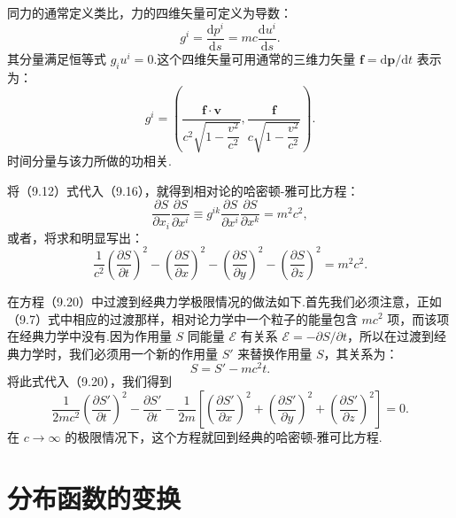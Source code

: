 同力的通常定义类比，力的四维矢量可定义为导数：
\begin{equation}
  g^i=\frac{\mathrm{d}p^i}{\mathrm{d}s}=mc\frac{\mathrm{d}u^i}{\mathrm{d}s}.
\end{equation}
其分量满足恒等式 $g_iu^i=0$.这个四维矢量可用通常的三维力矢量 $\boldsymbol{f}=\mathrm{d}\boldsymbol{p}/\mathrm{d}t$ 表示为：
\begin{equation}
  g^i=\left(\frac{\boldsymbol{f}\cdot\boldsymbol{v}}
  {c^2\sqrt{1-\dfrac{v^2}{c^2}}},
  \frac{\boldsymbol{f}}{c\sqrt{1-\dfrac{v^2}{c^2}}}\right).
\end{equation}
时间分量与该力所做的功相关.

将（9.12）式代入（9.16），就得到相对论的哈密顿-雅可比方程：
\begin{equation}
  \frac{\partial S}{\partial x_i}\frac{\partial S}{\partial x^i}
  \equiv g^{ik}\frac{\partial S}{\partial x^i}\frac{\partial S}{\partial x^k}
  =m^2c^2,
\end{equation}
或者，将求和明显写出：
\begin{equation}
  \frac{1}{c^2}\left(\frac{\partial S}{\partial t}\right)^2
  -\left(\frac{\partial S}{\partial x}\right)^2
  -\left(\frac{\partial S}{\partial y}\right)^2
  -\left(\frac{\partial S}{\partial z}\right)^2=m^2c^2.
\end{equation}

在方程（9.20）中过渡到经典力学极限情况的做法如下.首先我们必须注意，正如（9.7）式中相应的过渡那样，相对论力学中一个粒子的能量包含 $mc^2$ 项，而该项在经典力学中没有.因为作用量 $S$ 同能量 $\mathcal{E}$ 有关系 $\mathcal{E}=-\partial S/\partial t$，所以在过渡到经典力学时，我们必须用一个新的作用量 $S'$ 来替换作用量 $S$，其关系为：
\begin{equation*}
  S=S'-mc^2t.
\end{equation*}
将此式代入（9.20），我们得到
\begin{equation*}
  \frac{1}{2mc^2}\left(\frac{\partial S'}{\partial t}\right)^2
  -\frac{\partial S'}{\partial t}
  -\frac{1}{2m}\left[\left(\frac{\partial S'}{\partial x}\right)^2
  +\left(\frac{\partial S'}{\partial y}\right)^2
  +\left(\frac{\partial S'}{\partial z}\right)^2\right]=0.
\end{equation*}
在 $c\to\infty$ 的极限情况下，这个方程就回到经典的哈密顿-雅可比方程.

\section{分布函数的变换}

